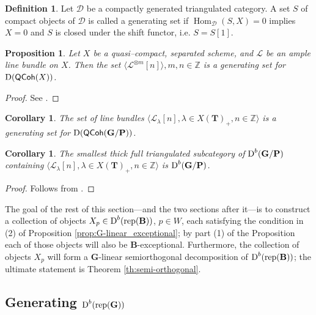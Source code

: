 \documentclass[sn-mathphys-num]{sn-jnl}%
\newcommand{\Ll}{\mathcal L}
\newcommand{\D}{\mathcal D}
\newcommand{\rep}{{\mathrm{rep}}}
\newcommand*{\Dd}{\mathop{\mathrm D\kern0pt}\nolimits}
\newcommand*{\Hom}{\mathop{\mathrm {Hom}}\nolimits}
\newcommand{\QCoh}{\mathsf{QCoh}}
\newcommand{\bg}{\mathbf G}
\newcommand{\fb}{\mathbf B}
\newcommand{\bt}{\mathbf T}
\newcommand{\bp}{\mathbf P}
\newtheorem{corollary}[theorem]{Corollary}
\newtheorem{proposition}[theorem]{Proposition}
\theoremstyle{definition}
\newtheorem{definition}[theorem]{Definition}%
\begin{document}
\begin{definition}
Let $\D$ be a compactly generated triangulated category. A set $S$ 
of compact objects of $\D$ is called a generating set if $\Hom _{\D}(S,X)=0$ implies $X=0$ and $S$ is closed under the shift functor, i.e. $S =S[1]$.
\end{definition}

\begin{proposition}\label{prop:ample_line_bundle_gen_set}
Let $X$ be a quasi--compact, separated scheme, and $\Ll$ be an ample line bundle on $X$. Then the set $\langle \Ll ^{\otimes m}[n]\rangle, m,n\in \mathbb Z$ is a generating set for $\Dd ({\QCoh}(X))$.
\end{proposition}

\begin{proof}
See \cite[Examples 1.10 and 1.11]{Neem}.
\end{proof}

\begin{corollary}\label{cor:line_bundles-generation}
The set of line bundles $\langle \Ll _{\lambda}[n],\lambda \in X(\bt)_+, n\in \mathbb Z\rangle$ is a generating set for $\Dd({\QCoh}( \bg/ \bp))$.
\end{corollary}

\begin{corollary}\label{cor:generatingGmodB}
The smallest thick full triangulated subcategory of $\Dd^b( \bg/ \bp)$ containing $\langle \Ll _{\lambda}[n],\lambda \in X(\bt)_+, n\in \mathbb Z\rangle$ is $\Dd^b( \bg/ \bp)$.
\end{corollary}

\begin{proof}
Follows from \cite[Corollary 2.3]{Neem}.
\end{proof}


The goal of the rest of this section---and the two sections after it---is to construct a collection of objects $X_p\in \Dd ^b(\rep( \fb))$, $p\in W$, each satisfying the condition in (2) of Proposition \ref{prop:G-linear_exceptional}; by part (1) of the Proposition
each of those objects will also be $\fb$-exceptional. Furthermore, the collection of objects $X_p$ will form a $ \bg$-linear semiorthogonal decomposition of $\Dd^b(\rep ({\fb}))$; the ultimate statement is Theorem \ref{th:semi-orthogonal}.


\subsection{Generating $\Dd^b (\rep ( \bg))$}\label{subsec:generatingrepG}
\end{document}
